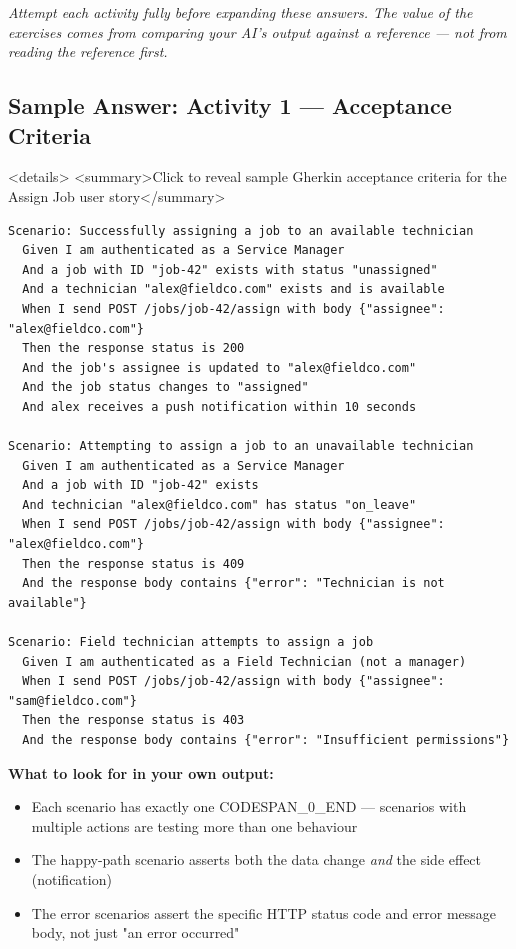 \documentclass[11pt,a4paper]{book}
\begin{document}
\textit{Attempt each activity fully before expanding these answers. The value of the exercises comes from comparing your AI's output against a reference --- not from reading the reference first.}

\medskip

\subsection{Sample Answer: Activity 1 --- Acceptance Criteria}

<details>
<summary>Click to reveal sample Gherkin acceptance criteria for the Assign Job user story</summary>

\begin{lstlisting}
Scenario: Successfully assigning a job to an available technician
  Given I am authenticated as a Service Manager
  And a job with ID "job-42" exists with status "unassigned"
  And a technician "alex@fieldco.com" exists and is available
  When I send POST /jobs/job-42/assign with body {"assignee": "alex@fieldco.com"}
  Then the response status is 200
  And the job's assignee is updated to "alex@fieldco.com"
  And the job status changes to "assigned"
  And alex receives a push notification within 10 seconds

Scenario: Attempting to assign a job to an unavailable technician
  Given I am authenticated as a Service Manager
  And a job with ID "job-42" exists
  And technician "alex@fieldco.com" has status "on_leave"
  When I send POST /jobs/job-42/assign with body {"assignee": "alex@fieldco.com"}
  Then the response status is 409
  And the response body contains {"error": "Technician is not available"}

Scenario: Field technician attempts to assign a job
  Given I am authenticated as a Field Technician (not a manager)
  When I send POST /jobs/job-42/assign with body {"assignee": "sam@fieldco.com"}
  Then the response status is 403
  And the response body contains {"error": "Insufficient permissions"}
\end{lstlisting}

\textbf{What to look for in your own output:}
\begin{itemize}
  \item Each scenario has exactly one CODESPAN\_0\_END --- scenarios with multiple actions are testing more than one behaviour
  \item The happy-path scenario asserts both the data change \textit{and} the side effect (notification)
  \item The error scenarios assert the specific HTTP status code and error message body, not just "an error occurred"
\end{itemize}
\end{document}
